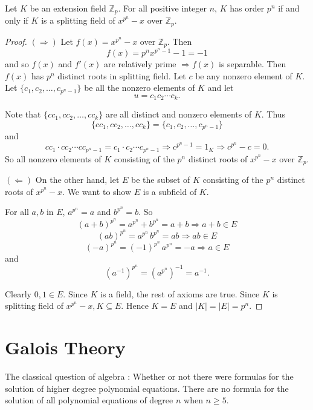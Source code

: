 \begin{theorem}
    Let $K$ be an extension field $\mathbb{Z}_p$. For all positive integer $n$, 
    $K$ has order $p^n$ if and only if $K$ is a splitting field of $x^{p^n} - x$ over $\mathbb{Z}_p$.
\end{theorem}
\begin{proof}
    $(\Rightarrow)$ Let $f(x) = x^{p^n} - x$ over $\mathbb{Z}_p$. Then 
    \[
        f(x) = p^n x^{p^n - 1} - 1 = -1 
    \]
    and so $f(x)$ and $f'(x)$ are relatively prime $\Longrightarrow f(x)$ is separable.
    Then $f(x)$ has $p^n$ distinct roots in splitting field. Let $c$ be any nonzero 
    element of $K$. Let $\{c_1, c_2, \ldots, c_{p^n - 1}\}$ be all the nonzero elements of 
    $K$ and let 
    \[
        u = c_1 c_2 \cdots c_k.
    \]

    Note that $\{cc_1, cc_2, \ldots, cc_k\}$ are all distinct and nonzero elements of $K$. Thus 
    \[
        \{cc_1, cc_2, \ldots, cc_k\} = \{c_1, c_2, \ldots, c_{p^n - 1}\}
    \]
    and 
    \[
        cc_1 \cdot cc_2 \cdots cc_{p^n - 1} = c_1 \cdot c_2 \cdots c_{p^n - 1} \Rightarrow 
        c^{p^n - 1} = 1_K \Rightarrow c^{p^n} - c = 0.
    \]
    So all nonzero elements of $K$ consisting of the $p^n$ distinct roots of $x^{p^n} - x$ over 
    $\mathbb{Z}_p$.

    $(\Leftarrow)$ On the other hand, let $E$ be the subset of $K$ consisting of the 
    $p^n$ distinct roots of $x^{p^n} - x$. We want to show $E$ is a subfield of $K$. 

    For all $a,b$ in $E$, $a^{p^n} = a$ and $b^{p^n} = b$. So
    \[
        (a+b)^{p^n} = a^{p^n} + b^{p^n} = a+b \Rightarrow a+b\in E
    \]
    \[
        (ab)^{p^n} = a^{p^n}\, b^{p^n} = ab \Rightarrow ab\in E
    \]
    \[
        (-a)^{p^n} = (-1)^{p^n}\, a^{p^n} = -a \Rightarrow a\in E 
    \]
    and 
    \[
        (a^{-1})^{p^n} = (a^{p^n})^{-1} = a^{-1}.
    \]

    Clearly $0,1 \in E$. Since $K$ is a field, the rest of axioms are true. 
    Since $K$ is splitting field of $x^{p^n} - x, K \subseteq E$. Hence 
    $K = E$ and $|K| = |E| = p^n$.
\end{proof}

\section{Galois Theory}

The classical question of algebra : Whether or not there were formulas for the solution of higher degree polynomial 
equations. There are no formula for the solution of all polynomial equations of degree $n$ when $n \geq 5$.

